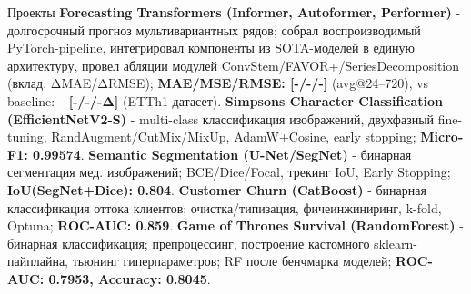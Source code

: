 \begin{rubric}{Проекты}
\entry*%
	\textbf{Forecasting Transformers (Informer, Autoformer, Performer)} - 
    долгосрочный прогноз мультивариантных рядов; собрал воспроизводимый 
    PyTorch-pipeline, интегрировал компоненты из SOTA-моделей в единую архитектуру, 
    провел абляции модулей ConvStem/FAVOR+/SeriesDecomposition (вклад: ΔMAE/ΔRMSE); 
    \textbf{MAE/MSE/RMSE: [{\color{red}-/-/-}]} (avg@24--720), 
    vs baseline: \textbf{$-$[{\color{red}-/-/-}Δ]} (ETTh1 датасет).
\entry*%
	\textbf{Simpsons Character Classification (EfficientNetV2-S)} - 
    multi-class классификация изображений, двухфазный fine-tuning, 
    RandAugment/CutMix/MixUp, AdamW+Cosine, early stopping; \textbf{Micro-F1: 0.99574}.
\entry*%
	\textbf{Semantic Segmentation (U-Net/SegNet)} - 
    бинарная сегментация мед. изображений; BCE/Dice/Focal, 
    трекинг IoU, Early Stopping; \textbf{IoU(SegNet+Dice): 0.804}.
\entry*%
	\textbf{Customer Churn (CatBoost)} - 
    бинарная классификация оттока клиентов; очистка/типизация, фичеинжиниринг, 
    k-fold, Optuna; \textbf{ROC-AUC: 0.859}.
\entry*%
	\textbf{Game of Thrones Survival (RandomForest)} - 
    бинарная классификация; препроцессинг, построение кастомного sklearn-пайплайна,
    тьюнинг гиперпараметров; RF после бенчмарка моделей; 
    \textbf{ROC-AUC: 0.7953, Accuracy: 0.8045}.
\end{rubric}

